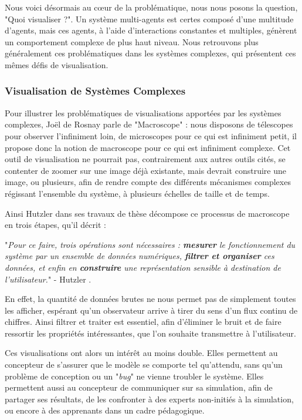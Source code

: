 		Nous voici désormais au cœur de la problématique, nous nous posons la question, "Quoi visualiser ?". Un système multi-agents est certes composé d'une multitude d'agents, mais ces agents, à l'aide d'interactions constantes et multiples, génèrent un comportement complexe de plus haut niveau. Nous retrouvons plus généralement ces problématiques dans les systèmes complexes, qui présentent ces mêmes défis de visualisation.
		
		\subsubsection{Visualisation de Systèmes Complexes}
		\label{sectionVisuComplexe}
		
		Pour illustrer les problématiques de visualisations apportées par les systèmes complexes, Joël de Rosnay parle de "Macroscope" \cite{de_rosnay_macroscope_1975} : nous disposons de télescopes pour observer l'infiniment loin, de microscopes pour ce qui est infiniment petit, il propose donc la notion de macroscope pour ce qui est infiniment complexe. Cet outil de visualisation ne pourrait pas, contrairement aux autres outils cités, se contenter de zoomer sur une image déjà existante, mais devrait construire une image, ou plusieurs, afin de rendre compte des différents mécanismes complexes régissant l'ensemble du système, à plusieurs échelles de taille et de temps.
		
		Ainsi Hutzler dans ses travaux de thèse \cite{hutzler_du_2000} décompose ce processus de macroscope en trois étapes, qu'il décrit :
		
		"\textit{Pour ce faire, trois opérations sont nécessaires : \textbf{mesurer} le fonctionnement du système par un ensemble de données numériques, \textbf{filtrer et organiser} ces données, et enfin en \textbf{construire} une représentation sensible à destination de l'utilisateur.}" - Hutzler \cite{hutzler_du_2000}.

	En effet, la quantité de données brutes ne nous permet pas de simplement toutes les afficher, espérant qu'un observateur arrive à tirer du sens d'un flux continu de chiffres. Ainsi filtrer et traiter est essentiel, afin d'éliminer le bruit et de faire ressortir les propriétés intéressantes, que l'on souhaite transmettre à l'utilisateur.

		
		 Ces visualisations ont alors un intérêt au moins double. Elles permettent au concepteur de s'assurer que le modèle se comporte tel qu'attendu, sans qu'un problème de conception ou un "\textit{bug}" ne vienne troubler le système. Elles permettent aussi au concepteur de communiquer sur sa simulation, afin de partager ses résultats, de les confronter à des experts non-initiés à la simulation, ou encore à des apprenants dans un cadre pédagogique.

